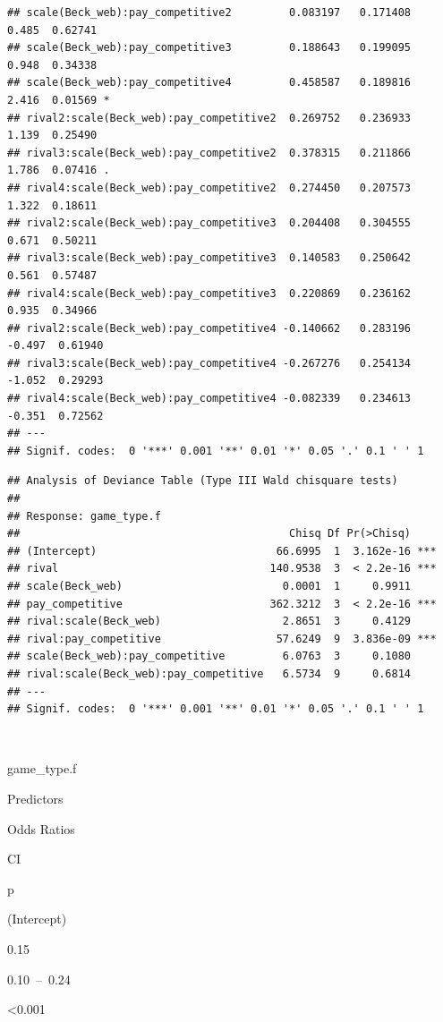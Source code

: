 \documentclass[
]{article}
\begin{document}
\begin{verbatim}
## scale(Beck_web):pay_competitive2         0.083197   0.171408   0.485  0.62741    
## scale(Beck_web):pay_competitive3         0.188643   0.199095   0.948  0.34338    
## scale(Beck_web):pay_competitive4         0.458587   0.189816   2.416  0.01569 *  
## rival2:scale(Beck_web):pay_competitive2  0.269752   0.236933   1.139  0.25490    
## rival3:scale(Beck_web):pay_competitive2  0.378315   0.211866   1.786  0.07416 .  
## rival4:scale(Beck_web):pay_competitive2  0.274450   0.207573   1.322  0.18611    
## rival2:scale(Beck_web):pay_competitive3  0.204408   0.304555   0.671  0.50211    
## rival3:scale(Beck_web):pay_competitive3  0.140583   0.250642   0.561  0.57487    
## rival4:scale(Beck_web):pay_competitive3  0.220869   0.236162   0.935  0.34966    
## rival2:scale(Beck_web):pay_competitive4 -0.140662   0.283196  -0.497  0.61940    
## rival3:scale(Beck_web):pay_competitive4 -0.267276   0.254134  -1.052  0.29293    
## rival4:scale(Beck_web):pay_competitive4 -0.082339   0.234613  -0.351  0.72562    
## ---
## Signif. codes:  0 '***' 0.001 '**' 0.01 '*' 0.05 '.' 0.1 ' ' 1
\end{verbatim}

\begin{verbatim}
## Analysis of Deviance Table (Type III Wald chisquare tests)
## 
## Response: game_type.f
##                                          Chisq Df Pr(>Chisq)    
## (Intercept)                            66.6995  1  3.162e-16 ***
## rival                                 140.9538  3  < 2.2e-16 ***
## scale(Beck_web)                         0.0001  1     0.9911    
## pay_competitive                       362.3212  3  < 2.2e-16 ***
## rival:scale(Beck_web)                   2.8651  3     0.4129    
## rival:pay_competitive                  57.6249  9  3.836e-09 ***
## scale(Beck_web):pay_competitive         6.0763  3     0.1080    
## rival:scale(Beck_web):pay_competitive   6.5734  9     0.6814    
## ---
## Signif. codes:  0 '***' 0.001 '**' 0.01 '*' 0.05 '.' 0.1 ' ' 1
\end{verbatim}

~

game\_type.f

Predictors

Odds Ratios

CI

p

(Intercept)

0.15

0.10~--~0.24

\textless0.001
\end{document}
